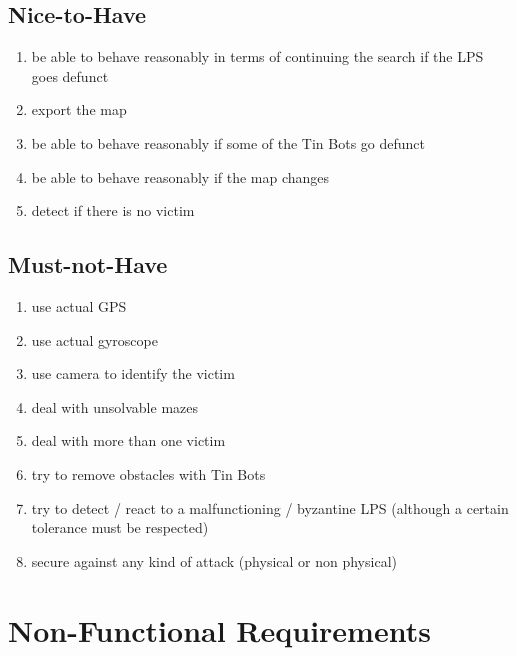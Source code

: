 \documentclass[a4paper,parskip,headheight=38pt]{scrartcl} %
\begin{document}
\subsection{Nice-to-Have}
\begin{enumerate}[label=\nicetohave,ref=\nicetohave]
\item be able to behave reasonably in terms of continuing the search if the LPS goes defunct\label{req:missLPS}
\item export the map
\item be able to behave reasonably if some of the Tin Bots go defunct \label{req:puckFault}
\item be able to behave reasonably if the map changes \label{req:mapChange}
\item detect if there is no victim
\end{enumerate}

\subsection{Must-not-Have}
\begin{enumerate}[label=\mustnothave]
\item use actual GPS
\item use actual gyroscope
\item use camera to identify the victim
\item deal with unsolvable mazes
\item deal with more than one victim
\item try to remove obstacles with Tin Bots
\item try to detect / react to a malfunctioning / byzantine LPS (although a certain tolerance must be respected)
\item secure against any kind of attack (physical or non physical)
\end{enumerate}

\section{Non-Functional Requirements}
\end{document}
